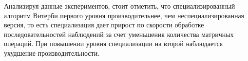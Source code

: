 Анализируя данные экспериментов, стоит отметить, что 
специализированный алгоритм Витерби первого уровня производительнее, 
чем неспециализированная версия, то есть специализация дает прирост 
по скорости обработке последовательностей наблюдений за счет 
уменьшения количества матричных операций.
При повышении уровня специализации на второй наблюдается 
ухудшение производительности.

\newpage